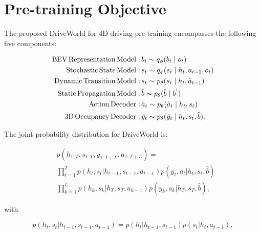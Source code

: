 \clearpage
\maketitlesupplementary

\section{Pre-training Objective}
\label{lbd}
The proposed DriveWorld for 4D driving pre-training encompasses the following five components:

\begin{footnotesize} 
	\begin{equation} \label{world_model}
	\begin{aligned}
	{\rm BEV \, Representation \, Model:}\, &b_t\sim q_\phi  (b_t\mid o_t) \\
	{\rm Stochastic \, State \, Model:}\, &s_t\sim q_\phi  (s_t\mid h_{t},a_{t-1},o_t) \\
	{\rm Dynamic \, Transition \, Model:}\, &s_t\sim p_\theta (s_t\mid h_t,\hat{a}_{t-1}) \\
	{\rm Static \, Propagation \, Model:}\, &\hat{b}\sim p_\theta (\hat{b}\mid b^{'}) \\
	{\rm Action \, Decoder:}\, &\hat{a}_t\sim p_\theta  (\hat{a}_t\mid h_{t},s_t) \\
	{\rm 3D \, Occupancy \, Decoder:}\, &\hat{y}_t\sim p_\theta  (\hat{y}_t\mid h_{t},s_t,\hat{b}). \\
	\end{aligned}
	\end{equation} 
\end{footnotesize}

The joint probability distribution for DriveWorld is:

\begin{footnotesize} 
	\begin{equation} \label{v1}
	\begin{aligned}
	&p(h_{1:T},s_{1:T},y_{1:T+L},a_{1:T+L})=\\&\displaystyle\prod_{t=1}^{T}p(h_t,s_t|h_{t-1},s_{t-1},a_{t-1})p(y_t,a_t|h_t,s_t,\hat{b})\\
	&\displaystyle\prod_{k=1}^{L}p(h_k,s_k|h_{T},s_{T},a_{k-1})p(y_k,a_k|h_T,s_T,\hat{b}),
	\end{aligned}
	\end{equation} 
\end{footnotesize}

with 

\begin{footnotesize} 
	\begin{equation} \label{v21}
	p(h_t,s_t|h_{t-1},s_{t-1},a_{t-1})=p(h_t|h_{t-1},s_{t-1})p(s_t|h_t,a_{t-1}),
	\end{equation} 
\end{footnotesize}

